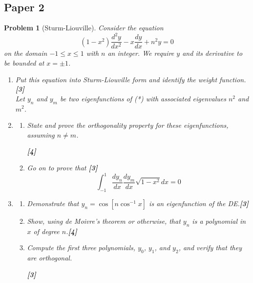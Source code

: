 \documentclass[a4paper]{article}
\theoremstyle{new}
\newtheorem{qns}{Problem}[section]
\begin{document}
\subsection{Paper 2}
\begin{qns}[Sturm-Liouville]
Consider the equation
\begin{equation}
    (1-x^2)\frac{d^2y}{dx^2}-x\frac{dy}{dx}+n^2y=0\tag{*}
\end{equation}
on the domain $-1\leq x\leq 1$ with $n$ an integer. We require $y$ and its derivative to be bounded at $x=\pm 1$.
\begin{enumerate}[label=(\roman*)]
\item Put this equation into Sturm-Liouville form and identify the weight function.\hfill\textbf{[3]}\\[5pt]
Let $y_n$ and $y_m$ be two eigenfunctions of (*) with associated eigenvalues $n^2$ and $m^2$.
\item
\begin{enumerate}[label=(\alph*)]
\item State and prove the orthogonality property for these eigenfunctions, assuming $n\neq m$.

\hfill\textbf{[4]}
\item Go on to prove that \hfill\textbf{[3]}
$$\int_{-1}^1\frac{dy_n}{dx}\frac{dy_m}{dx}\sqrt{1-x^2}dx=0$$
\end{enumerate}
\item
\begin{enumerate}[label=(\alph*)]
\item Demonstrate that $y_n=\cos[n\cos^{-1}x]$ is an eigenfunction of the DE.\hfill\textbf{[3]}
\item Show, using de Moivre’s theorem or otherwise, that $y_n$ is a polynomial in $x$ of degree $n$.\hfill\textbf{[4]}
\item Compute the first three polynomials, $y_0$, $y_1$, and $y_2$, and verify that they are orthogonal.

\hfill\textbf{[3]}
\end{enumerate}
\end{enumerate}
\end{qns}
\end{document}
